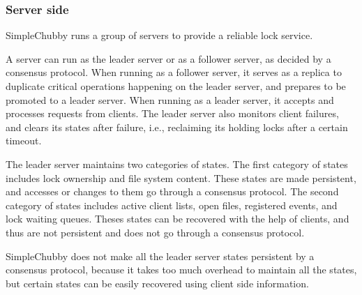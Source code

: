\subsubsection{Server side}

SimpleChubby runs a group of servers to provide a reliable lock service.

A server can run as the leader server or as a follower server,
as decided by a consensus protocol.
When running as a follower server, it serves as a replica to duplicate critical
operations happening on the leader server, and prepares to be promoted to a leader server.
When running as a leader server, it accepts and processes requests from clients.
The leader server also monitors client failures, and clears its states after failure,
i.e., reclaiming its holding locks after a certain timeout.

The leader server maintains two categories of states.
The first category of states includes lock ownership and file system content. These
states are made persistent, and accesses or changes to them go through a consensus protocol.
The second category of states includes active client lists,
open files, registered events, and lock waiting queues.
Theses states can be recovered with the help of clients,
and thus are not persistent and does not go through a consensus protocol.

SimpleChubby does not make all the leader server states persistent by a consensus protocol,
because it takes too much overhead to maintain all the states,
but certain states can be easily recovered
using client side information.
